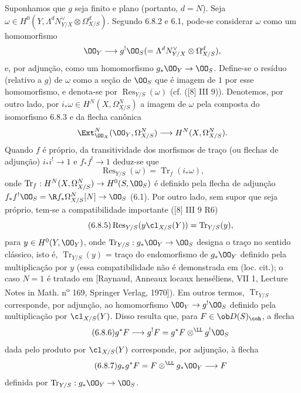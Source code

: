 Suponhamos que $g$ seja finito e plano (portanto, $d=N$). Seja $\omega\in H^0(Y,\Lambda^d N_{Y/X}^{\vee}\otimes\Omega^d_{X/S})$. Segundo 6.8.2 e 6.1, pode-se considerar $\omega$ como um homomorfismo
\[
\OO_Y\longrightarrow g^!\OO_S(=\Lambda^d N_{Y/X}^{\vee}\otimes\Omega^d_{X/S}),
\]
e, por adjunção, como um homomorfismo $g_*\OO_Y\to\OO_S$. Define-se o resíduo (relativo a $g$) de $\omega$ como a seção de $\OO_S$ que é imagem de $1$ por esse homomorfismo, e denota-se por $\operatorname{Res}_{Y/S}(\omega)$ (cf. ([8] III 9)). Denotemos, por outro lado, por $i_*\omega\in H^N(X,\Omega^N_{X/S})$ a imagem de $\omega$ pela composta do isomorfismo 6.8.3 e da flecha canônica
\[
\Ext^N_{\OO_X}(\OO_Y,\Omega^N_{X/S})\longrightarrow H^N(X,\Omega^N_{X/S}).
\]
Quando $f$ é próprio, da transitividade dos morfismos de traço (ou flechas de adjunção) $i_*i^!\to 1$ e $f_*f^!\to 1$ deduz-se que
\begin{equation}
\tag{6.8.4}
\operatorname{Res}_{Y/S}(\omega)=\operatorname{Tr}_f(i_*\omega),
\end{equation}
onde $\operatorname{Tr}_f:H^N(X,\Omega^N_{X/S})\to H^0(S,\OO_S)$ é definido pela flecha de adjunção $f_*f^!\OO_S=\R f_*\Omega^N_{X/S}[N]\to\OO_S$ (6.1). Por outro lado, sem supor que seja próprio, tem-se a compatibilidade importante ([8] III 9 R6)
\begin{equation}
\tag{6.8.5}
\operatorname{Res}_{Y/S}(y\cl_{X/S}(Y))=\operatorname{Tr}_{Y/S}(y),
\end{equation}
para $y\in H^0(Y,\OO_Y)$, onde $\operatorname{Tr}_{Y/S}:g_*\OO_Y\to\OO_S$ designa o traço no sentido clássico, isto é, $\operatorname{Tr}_{Y/S}(y)$ = traço do endomorfismo de $g_*\OO_Y$ definido pela multiplicação por $y$ (essa compatibilidade não é demonstrada em (loc. cit.); o caso $N=1$ é tratado em [Raynaud, Anneaux locaux henséliens, VII 1, Lecture Notes in Math. n\textsuperscript{o} 169, Springer Verlag, 1970]). Em outros termos, $\operatorname{Tr}_{Y/S}$ corresponde, por adjunção, ao homomorfismo $\OO_Y\to g^!\OO_S$ definido pela multiplicação por $\cl_{X/S}(Y)$. Disso resulta que, para $F\in\ob D(S)_{\coh}$, a flecha
\begin{equation}
\tag{6.8.6}
g^*F\longrightarrow g^!F=g^*F\otimes^{\LL}g^!\OO_S
\end{equation}
dada pelo produto por $\cl_{X/S}(Y)$ corresponde, por adjunção, à flecha
\begin{equation}
\tag{6.8.7}
g_*g^*F=F\otimes^{\LL}g_*\OO_Y\longrightarrow F
\end{equation}
definida por $\operatorname{Tr}_{Y/S}:g_*\OO_Y\to\OO_S$.
